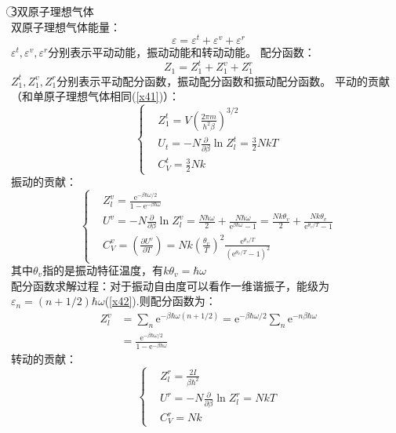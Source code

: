 \documentclass[12pt]{article}
\begin{document}
\textcircled{3}双原子理想气体\\
双原子理想气体能量：
\begin{equation}
	\varepsilon=\varepsilon^t+\varepsilon^v+\varepsilon^r
\end{equation}
$\varepsilon^t,\varepsilon^v, \varepsilon^r$分别表示平动动能，振动动能和转动动能。
配分函数：
\begin{equation}
	Z_1=Z_1^t+Z_1^v+Z_1^r
\end{equation}
$Z_1^t, Z_1^v, Z_1^r$分别表示平动配分函数，振动配分函数和振动配分函数。
平动的贡献（和单原子理想气体相同(\ref{x41})）：
\begin{equation}
	\left \{\begin{split} 
	&Z_1^t=V(\frac{2\pi m}{h^2\beta})^{3/2}\\
	&U_t=-N\frac{\partial}{\partial \beta}\ln Z_l^t=\frac{3}{2}NkT\\
    &C_V^t=\frac{3}{2}Nk
\end{split}\right. 
\end{equation}
振动的贡献：
\begin{equation}
	\left \{\begin{split}
		&Z_l^v=\frac{\mathrm{e}^{-\beta\hbar\omega/2}}{1-\mathrm{e}^{-\beta\hbar\omega}}\\
		&U^v=-N\frac{\partial}{\partial \beta}\ln Z_l^v=\frac{N\hbar\omega}{2}+\frac{N\hbar\omega}{\mathrm{e}^{\beta\hbar\omega}-1}=\frac{Nk\theta_v}{2}+\frac{Nk\theta_v}{\mathrm{e}^{\theta_v/T}-1}\\
		&C_V^v=(\frac{\partial U^v}{\partial T})=Nk(\frac{\theta_v}{T})^2\frac{\mathrm{e}^{\theta_v/T}}{(\mathrm{e}^{\theta_v/T}-1)^2}
		\end{split}\right. 
\end{equation}
其中$\theta_v$指的是振动特征温度，有$k\theta_v=\hbar \omega$
\\
配分函数求解过程：对于振动自由度可以看作一维谐振子，能级为$\varepsilon_n=(n+1/2)\hbar\omega$(\ref{x42}).则配分函数为：
\begin{equation}
	\begin{split} 
	Z_l^v&=\sum_n \mathrm{e}^{-\beta \hbar \omega(n+1/2)}=\mathrm{e}^{-\beta\hbar \omega/2}\sum_n \mathrm{e}^{-n\beta \hbar\omega }\\
	&=\frac{\mathrm{e}^{-\beta\hbar\omega/2}}{1-\mathrm{e}^{-\beta\hbar\omega}}
\end{split}
\end{equation}
转动的贡献：
\begin{equation}
	\left \{\begin{split}
		&Z_l^r=\frac{2I}{\beta \hbar^2}\\
		&U^r=-N\frac{\partial}{\partial \beta}\ln Z_l^r=NkT\\
		&C_V^r=Nk
		\end{split}\right.
\end{equation}
\end{document}
